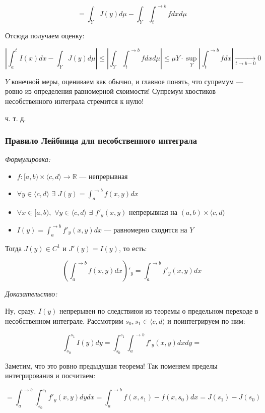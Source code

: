 \documentclass{article}
\def\dbl{\,\,}
\def\goesto#1{\underset{#1}{\longrightarrow}}
\begin{document}
\[= \int_{Y} J(y) d\mu - \int_{Y} \int_t^{\rightarrow b} f dx d\mu\]

Отсюда получаем оценку:

\[\left| \int_a^t I(x) dx - \int_{Y} J(y) d\mu\right| \le \left| \int_{Y} \int_t^{\rightarrow b} f dx d\mu\right| \le \mu Y \cdot \sup_{Y} \left| \int_t^{\rightarrow b}f dx\right| \goesto{t \rightarrow b - 0} 0 \]

$Y$ конечной меры, оцениваем как обычно, и главное понять, что супремум --- ровно из определения равномерной схоимости! Супремум хвостиков несобственного интеграла стремится к нулю!

ч. т. д.

\subsubsection{Правило Лейбница для несобственного интеграла}
\textit{Формулировка:}

\begin{itemize}
    \item $f: [a, b) \times \langle c, d \rangle \rightarrow \mathbb{R}$ --- непрерывная
    \item $\forall y \in \langle c, d \rangle \dbl \exists \dbl J(y) = \int_a^{\rightarrow b} f(x, y) dx$
    \item $\forall x \in [a, b), \dbl \forall y \in \langle c, d \rangle \dbl \exists \dbl f'_y(x, y)$ непрерывная на $(a, b) \times \langle c, d \rangle$
    \item $I(y) = \int_a^{\rightarrow b} f'_y(x, y) dx$ --- равномерно сходится на $Y$
\end{itemize}

Тогда $J(y) \in C^1$ и $J'(y) = I(y)$, то есть:

\[\left(\int_a^{\rightarrow b} f(x, y) dx\right)'_y = \int_a^{\rightarrow b} f'_y(x, y) dx\]

\textit{Доказательство:}

Ну, сразу, $I(y)$ непрерывен по следствиюи из теоремы о предельном переходе в несобственном интеграле. Рассмотрим $s_0, s_1 \in \langle c, d \rangle$ и поинтегрируем по ним:

\[\int_{s_0}^{s_1} I(y) dy = \int_{s_0}^{s_1} \int_a^{\rightarrow b} f'_y(x, y) dx dy = \]

Заметим, что это ровно предыдущая теорема! Так поменяем пределы интегрирования и посчитаем:

\[= \int_a^{\rightarrow b} \int_{s_0}^{s_1} f'_y(x, y) dy dx = \int_{a}^{\rightarrow b} f(x, s_1) - f(x, s_0) dx = J(s_1) - J(s_0)\]
\end{document}
